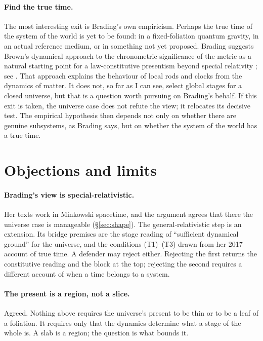 \documentclass[11pt]{article}
\begin{document}
\paragraph{Find the true time.} The most interesting exit is Brading's own
empiricism. Perhaps the true time of the system of the world is yet to be found:
in a fixed-foliation quantum gravity, in an actual reference medium, or in
something not yet proposed. Brading suggests Brown's dynamical approach to the
chronometric significance of the metric as a natural starting point for a
law-constitutive presentism beyond special relativity \citep[p.~18]{Brading2015};
see \citet{Brown2005}. That approach explains the behaviour of local rods and
clocks from the dynamics of matter. It does not, so far as I can see, select
global stages for a closed universe, but that is a question worth pursuing on
Brading's behalf. If this exit is taken, the universe case does not refute the
view; it relocates its decisive test. The empirical hypothesis then depends not
only on whether there are genuine subsystems, as Brading says, but on whether the
system of the world has a true time.

\section{Objections and limits}\label{sec:limits}

\paragraph{Brading's view is special-relativistic.} Her texts work in Minkowski
spacetime, and the argument agrees that there the universe case is manageable
(\S\ref{sec:shape}). The general-relativistic step is an extension. Its bridge
premises are the stage reading of ``sufficient dynamical ground'' for the
universe, and the conditions (T1)--(T3) drawn from her 2017 account of true time.
A defender may reject either. Rejecting the first returns the constitutive
reading and the block at the top; rejecting the second requires a different
account of when a time belongs to a system.

\paragraph{The present is a region, not a slice.} Agreed. Nothing above requires
the universe's present to be thin or to be a leaf of a foliation. It requires
only that the dynamics determine what a stage of the whole is. A slab is a region;
the question is what bounds it.
\end{document}
